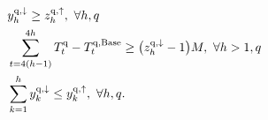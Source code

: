 \documentclass[conference]{IEEEtran}
\begin{document}
{\begin{subequations}
\begin{align}
        \  & y^{\rm{q},\downarrow}_{h} \geq z^{\rm{q},\uparrow}_{h}, \                                                                                                                                                                                                                                                                 \forall{h,q} \label{rebound:1}                                                                                                                                                                                     \\
        \  & \sum_{t=4(h-1)}^{4 h} T^{\rm{q}}_{t} - T^{\rm{q}, \rm{Base}}_{t} \geq \big( z^{\rm{q},\downarrow}_{h} -1\big)  M,  \  \forall{h>1,q} \label{rebound:3}                                                                                                                                                                                                                                                                                                                                                                                 \\
        \  & \sum_{k=1}^{h} y^{\rm{q},\downarrow}_{k} \leq y^{\rm{q},\uparrow}_{k}, \ \forall{h,q}. \label{up_reg_first}
    \end{align}
\end{subequations}

}
\end{document}
